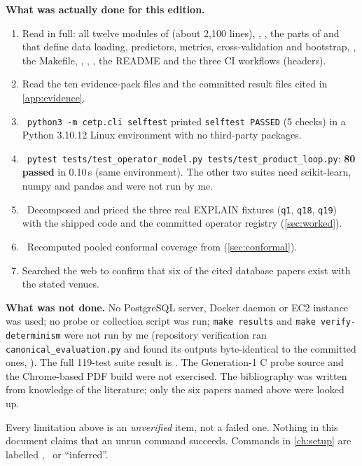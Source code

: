 \textbf{What was actually done for this edition.}
\begin{enumerate}
\item Read in full: all twelve modules of  (about 2,100 lines), ,
  , the parts of 
  and  that define data loading, predictors, metrics, cross-validation and
  bootstrap, , the Makefile, ,
  , , the README and the three CI workflows (headers).
\item Read the ten evidence-pack files  and the committed result files cited in
  \cref{app:evidence}.
\item \evRUN\ \texttt{python3 -m cetp.cli selftest} printed \texttt{selftest PASSED} (5 checks) in a
  Python 3.10.12 Linux environment with no third-party packages.
\item \evRUN\ \texttt{pytest tests/test\_operator\_model.py tests/test\_product\_loop.py}: \textbf{80 passed}
  in 0.10\,s (same environment). The other two suites need scikit-learn, numpy and pandas and were not run by me.
\item \evRUN\ Decomposed and priced the three real EXPLAIN fixtures (\texttt{q1}, \texttt{q18}, \texttt{q19}) with the
  shipped code and the committed operator registry (\cref{sec:worked}).
\item \evRUN\ Recomputed pooled conformal coverage from  (\cref{sec:conformal}).
\item Searched the web to confirm that six of the cited database papers exist with the stated venues.
\end{enumerate}

\textbf{What was not done.} No PostgreSQL server, Docker daemon or EC2 instance was used; no probe or
collection script was run; \texttt{make results} and \texttt{make verify-determinism} were not run by me
(repository verification ran \texttt{canonical\_evaluation.py} and found its outputs byte-identical to the
committed ones, \evPACK). The full 119-test suite result is \evPACK. The Generation-1 C probe source and the
Chrome-based PDF build were not exercised. The bibliography was written from knowledge of the literature;
only the six papers named above were looked up.

\begin{honest}
Every limitation above is an \emph{unverified} item, not a failed one. Nothing in this document claims that
an unrun command succeeds. Commands in \cref{ch:setup} are labelled \evRUN, \evPACK\ or ``inferred''.
\end{honest}
